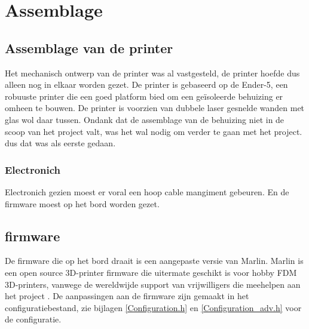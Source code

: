 \chapter{Assemblage}
\label{Assemblage}

\section{Assemblage van de printer}

Het mechanisch ontwerp van de printer was al vastgesteld, de printer hoefde dus
alleen nog in elkaar worden gezet. De printer is gebaseerd op de Ender-5, een
robuuste printer die een goed platform bied om een geïsoleerde behuizing  er
omheen te bouwen. De printer is voorzien van dubbele laser gesnelde wanden met
glas wol daar tussen. Ondank dat de assemblage van de behuizing niet in de
scoop van het project valt, was het wal nodig om verder te gaan met het
project. dus dat was als eerste gedaan.

\subsection{Electronich}

Electronich gezien moest er voral een hoop cable mangiment gebeuren. En de
firmware moest op het bord worden gezet.

\section{firmware}

De firmware die op het bord draait is een aangepaste versie van Marlin. Marlin
is een open source 3D-printer firmware die uitermate geschikt is voor hobby FDM
3D-printers, vanwege de wereldwijde support van vrijwilligers die meehelpen aan
het project \cite{Marlin}. De aanpassingen aan de firmware zijn gemaakt in het
configuratiebestand, zie bijlagen \ref{Configuration.h} en
\ref{Configuration_adv.h} voor de configuratie.

